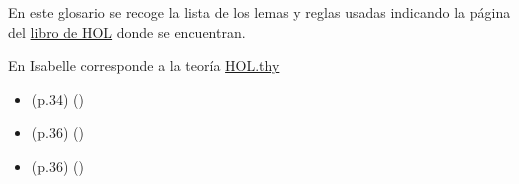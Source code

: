 %
\begin{isabellebody}%
%
%
\isadelimtheory
%
\endisadelimtheory
%
\isatagtheory
%
\endisatagtheory
{\isafoldtheory}%
%
\isadelimtheory
%
\endisadelimtheory
%
\begin{isamarkuptext}%
En este glosario se recoge la lista de los lemas y reglas usadas
  indicando la página del \href{https://bit.ly/2KvG2ej}{libro de HOL} 
  donde se encuentran.%
\end{isamarkuptext}\isamarkuptrue%
%
\isadelimdocument
%
\endisadelimdocument
%
\isatagdocument
%
\isamarkuptrue%
%
\endisatagdocument
{\isafolddocument}%
%
\isadelimdocument
%
\endisadelimdocument
%
\begin{isamarkuptext}%
En Isabelle corresponde a la teoría 
  \href{https://bit.ly/3bGva9s}{HOL.thy}%
\end{isamarkuptext}\isamarkuptrue%
%
\isadelimdocument
%
\endisadelimdocument
%
\isatagdocument
%
\isamarkuptrue%
%
\isamarkuptrue%
%
\endisatagdocument
{\isafolddocument}%
%
\isadelimdocument
%
\endisadelimdocument
%
\begin{isamarkuptext}%
\begin{itemize}
    \item (p.34)  
      \hfill ()
  \end{itemize}%
\end{isamarkuptext}\isamarkuptrue%
%
\isadelimdocument
%
\endisadelimdocument
%
\isatagdocument
%
\isamarkuptrue%
%
\endisatagdocument
{\isafolddocument}%
%
\isadelimdocument
%
\endisadelimdocument
%
\begin{isamarkuptext}%
\begin{itemize}
    \item (p.36)  
      \hfill ()
    \item (p.36)  
      \hfill ()
  \end{itemize}%
\end{isamarkuptext}\isamarkuptrue%
%
\isadelimdocument

\end{isabellebody}
